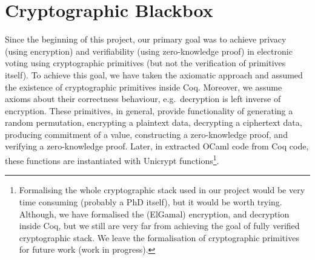 \section{Cryptographic Blackbox}
Since the beginning of this project, our primary goal was 
to achieve privacy (using encryption) and verifiability (using zero-knowledge proof) in electronic voting 
using cryptographic primitives (but not the verification of primitives itself). 
To achieve this goal, we have 
taken the axiomatic approach and assumed the existence of cryptographic primitives 
inside Coq. Moreover, we assume axioms about their correctness behaviour, e.g.~decryption 
is left inverse of encryption. These primitives, in general, provide functionality 
of generating a random permutation, encrypting a plaintext data, decrypting a ciphertext data, 
producing commitment of a value, constructing a zero-knowledge proof, 
and verifying a zero-knowledge proof. Later, in extracted OCaml code from Coq code, these functions are instantiated 
with Unicrypt \citep{LocherH14} functions\footnote{Formalising the whole cryptographic stack used in our 
project would be very time consuming (probably a PhD itself), but it would be worth trying. 
Although, we have formalised the (ElGamal) encryption, and decryption inside Coq, but we still 
are very far from achieving the goal of fully verified cryptographic stack.  We leave the formalisation 
of cryptographic primitives for future work (work in progress).}.



